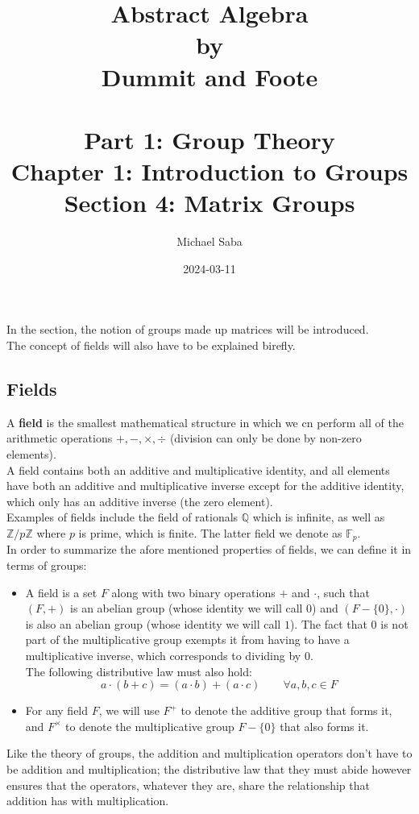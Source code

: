 \documentclass[12pt]{article}
\title{%
    \Huge Abstract Algebra \\
    \large by \\
    \Large Dummit and Foote \\~\\
    \huge Part 1: Group Theory \\
    \LARGE Chapter 1: Introduction to Groups \\
    \Large Section 4: Matrix Groups
}
\date{2024-03-11}
\author{Michael Saba}
\newcommand{\Z}{\mathbb{Z}}
\newcommand{\Q}{\mathbb{Q}}
\begin{document}
    \maketitle
    \newpage


    In the section, the notion of groups made up matrices
    will be introduced. \\
    The concept of fields will also have to be explained birefly. \\

    \subsection*{Fields}

    A \textbf{field} is the smallest mathematical structure
    in which we cn perform
    all of the arithmetic operations $+, -, \times, \div$ 
    (division can only be done by non-zero elements). \\
    A field contains both an additive and multiplicative identity,
    and all elements have both an additive and multiplicative inverse
    except for the additive identity,
    which only has an additive inverse
    (the zero element). \\
    Examples of fields include the field of rationals $\Q$
    which is infinite,
    as well as $\Z/p\Z$ where $p$ is prime,
    which is finite.
    The latter field we denote as $\mathbb{F}_p$. \\

    In order to summarize the afore mentioned properties of fields,
    we can define it in terms of groups:
    \begin{itemize}[label=$\diamond$]
        \item 
            A field is a set $F$
            along with two binary operations $+$ and $\cdot$,
            such that $(F, +)$ is an abelian group
            (whose identity we will call $0$)
            and $(F - \{0\}, \cdot)$ is also an abelian group
            (whose identity we will call $1$).
            The fact that $0$ is not part of the multiplicative group
            exempts it from having to have a multiplicative inverse,
            which corresponds to dividing by $0$. \\
            The following distributive law must also hold: 
            \[ a \cdot (b + c) = (a \cdot b) + (a \cdot c)
            \qquad \forall a, b, c \in F \]
        \item 
            For any field $F$,
            we will use $F^+$ to denote the additive group that forms it,
            and $F^\times$ to denote the multiplicative group $F - \{0\}$
            that also forms it.
    \end{itemize}
    Like the theory of groups,
    the addition and multiplication operators don't have to be
    addition and multiplication;
    the distributive law that they must abide however ensures
    that the operators, whatever they are,
    share the relationship that addition has with multiplication. \\
\end{document}
